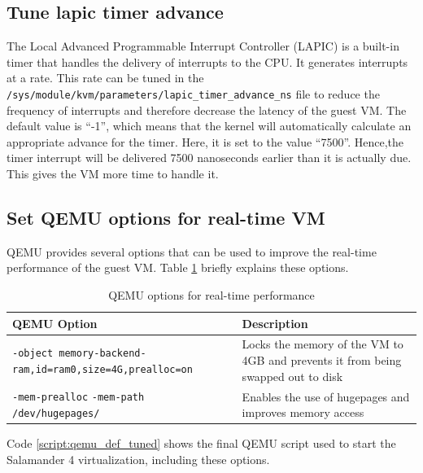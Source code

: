 \documentclass[MMR,Master,english]{twbook}
\begin{document}
\subsection{Tune lapic timer advance}
The Local Advanced Programmable Interrupt Controller (LAPIC) is a built-in timer that handles the delivery of interrupts to the CPU.
It generates interrupts at a rate. This rate can be tuned in the \texttt{/sys/module/kvm/parameters/lapic\_timer\_advance\_ns} file to reduce the frequency of interrupts and therefore decrease the latency of the guest VM. The default value is ``-1'', which means that the kernel will automatically calculate an appropriate advance for the timer. Here, it is set to the value ``7500''. Hence,the timer interrupt will be delivered 7500 nanoseconds earlier than it is actually due. This gives the VM more time to handle it.

\subsection{Set QEMU options for real-time VM}
QEMU provides several options that can be used to improve the real-time performance of the guest VM. Table \ref{tab:qemu_options} briefly explains these options.

\begin{table}[H]
    \centering
    \caption{QEMU options for real-time performance}
    \label{tab:qemu_options}
    \setlength{\tabcolsep}{0.5em} %
    {\renewcommand{\arraystretch}{1.2}%
    \begin{tabular}{|p{6.5cm}|p{8cm}|}
    \hline
    \textbf{QEMU Option} & \textbf{Description} \\\hline
    \texttt{-object memory-backend-ram,}\newline\texttt{id=ram0,size=4G,prealloc=on} & Locks the memory of the VM to 4GB and prevents it from being swapped out to disk \\\hline
    \texttt{-mem-prealloc} \newline \texttt{-mem-path /dev/hugepages/} & Enables the use of hugepages and improves \newline memory access \\\hline
    \end{tabular}}
    \end{table}

\noindent Code \ref{script:qemu_def_tuned} shows the final QEMU script used to start the Salamander 4 virtualization, including these options.
\end{document}
